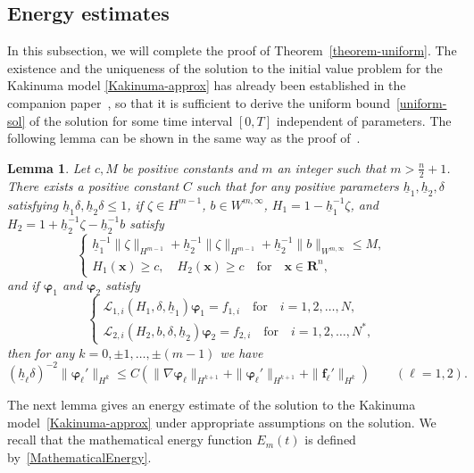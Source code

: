 \documentclass[11pt,leqno]{article}
\newtheorem{lemma}[theorem]{\bf Lemma}
\numberwithin{equation}{section}
\numberwithin{figure}{section}
\begin{document}
\subsection{Energy estimates}\label{S.energy-estimates}
%
In this subsection, we will complete the proof of Theorem~\ref{theorem-uniform}. 
The existence and the uniqueness of the solution to the initial value problem for the Kakinuma model 
\eqref{Kakinuma-approx} has already been established in the companion paper~\cite{DucheneIguchi2020}, 
so that it is sufficient to derive the uniform bound~\eqref{uniform-sol} of the solution for some 
time interval $[0,T]$ independent of parameters. 
The following lemma can be shown in the same way as the proof of~\cite[Lemma 4.2]{Iguchi2018-2}. 


\begin{lemma}\label{L.EE-low}
Let $c,M$ be positive constants and $m$ an integer such that $m>\frac{n}{2}+1$. 
There exists a positive constant $C$ such that for any  positive parameters $\underline{h}_1, \underline{h}_2, \delta$ 
satisfying $\underline{h}_1\delta, \underline{h}_2\delta \leq 1$, if $\zeta\in H^{m-1}$, $b\in W^{m,\infty}$, 
$H_1=1-\underline{h}_1^{-1}\zeta$, and $H_2=1+\underline{h}_2^{-1}\zeta-\underline{h}_2^{-1}b$ satisfy 
%
\[
\begin{cases}
 \underline{h}_1^{-1}\|\zeta\|_{H^{m-1}} + \underline{h}_2^{-1}\|\zeta\|_{H^{m-1}}
  + \underline{h}_2^{-1}\|b\|_{W^{m,\infty}} \leq M, \\
 H_1(\bm{x})\geq c, \quad H_2(\bm{x})\geq c \quad\mbox{for}\quad \bm{x}\in\mathbf{R}^n,
\end{cases}
\]
%
and if $\bm{\varphi}_1$ and $\bm{\varphi}_2$ satisfy 
%
\[
\begin{cases}
 \mathcal{L}_{1,i}(H_1,\delta,\underline{h}_1)\bm{\varphi}_1=f_{1,i}
  \quad\mbox{for}\quad i=1,2,\ldots,N, \\
 \mathcal{L}_{2,i}(H_2,b,\delta,\underline{h}_2)\bm{\varphi}_2=f_{2,i}
  \quad\mbox{for}\quad i=1,2,\ldots,N^*,
\end{cases}
\]
%
then for any $k=0,\pm1,\ldots,\pm(m-1)$ we have 
%
\[
(\underline{h}_\ell\delta)^{-2}\|\bm{\varphi}_\ell'\|_{H^k} \leq
 C(\|\nabla\bm{\varphi}_\ell\|_{H^{k+1}} + \|\bm{\varphi}_\ell'\|_{H^{k+1}} + \|\bm{f}_\ell'\|_{H^k}) \qquad (\ell=1,2). 
\]
\end{lemma}


The next lemma gives an energy estimate of the solution to the Kakinuma model~\eqref{Kakinuma-approx} 
under appropriate assumptions on the solution. 
We recall that the mathematical energy function $E_m(t)$ is defined by~\eqref{MathematicalEnergy}. 
\end{document}
